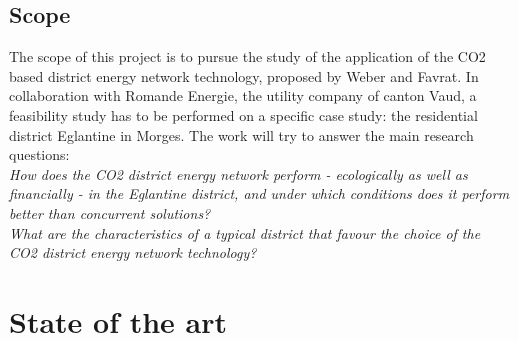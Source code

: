 \documentclass{article}
\begin{document}

\subsection{Scope}
The scope of this project is to pursue the study of the application of the CO2 based district energy network technology, proposed by Weber and Favrat\cite{weberConventionalAdvancedCO22010a}. In collaboration with Romande Energie, the utility company of canton Vaud, a feasibility study has to be performed on a specific case study: the residential district Eglantine in Morges. The work will try to answer the main research questions:\\

\textit{How does the CO2 district energy network perform - ecologically as well as financially - in the Eglantine district, and under which conditions does it perform better than concurrent solutions?}\\

\textit{What are the characteristics of a typical district that favour the choice of the CO2 district energy network technology?}


\section{State of the art}
\end{document}
